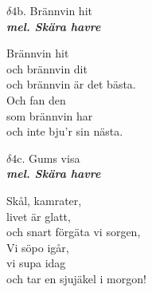 \documentclass[a6paper,10pt]{article}
\newcommand{\mel}[1]{\small\textbf{\textit{mel. #1 \\}}}
\begin{document}
\newpage
\setlength{\oddsidemargin}{-0.37in}
\noindent
\begin{center}
\Large $\delta4$b. Brännvin hit\\ 
\mel{Skära havre}
\end{center}
Brännvin hit \\
och brännvin dit \\
och brännvin är det bästa. \\
Och fan den \\
som brännvin har \\
och inte bju'r sin nästa. 
\vspace{10pt}
\begin{center}
\Large $\delta4$c. Gums visa\\ 
\mel{Skära havre}
\end{center}
\vspace{-5pt}
Skål, kamrater, \\
livet är glatt, \\
och snart förgäta vi sorgen, \\
Vi söpo igår, \\
vi supa idag \\
och tar en sjujäkel i morgon!
\end{document}
